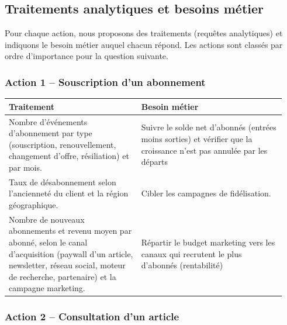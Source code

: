 \documentclass[a4paper,12pt]{article}
\begin{document}
\subsection{Traitements analytiques et besoins métier}

Pour chaque action, nous proposons des traitements (requêtes analytiques)
et indiquons le besoin métier auquel chacun répond. Les actions sont classés par ordre d'importance pour la question suivante.

\subsubsection*{Action 1 -- Souscription d'un abonnement}

\begin{center}
\renewcommand{\arraystretch}{1.3}
\begin{tabular}{@{}p{0.45\linewidth}p{0.49\linewidth}@{}}
  \toprule
  \textbf{Traitement} & \textbf{Besoin métier} \\
  \midrule
  Nombre d’événements d’abonnement par type (souscription, renouvellement, changement d’offre, résiliation) et par mois.
    & Suivre le solde net d’abonnés (entrées moins sorties) et vérifier que la croissance n’est pas annulée par les départs \\
  \addlinespace
  Taux de désabonnement selon l'ancienneté du client et la région
  géographique.
    & Cibler les campagnes de fidélisation. \\
  \addlinespace
  Nombre de nouveaux abonnements et revenu moyen par abonné, selon le canal d’acquisition (paywall d’un article, newsletter, réseau social, moteur de recherche, partenaire) et la campagne marketing.
    & Répartir le budget marketing vers les canaux qui recrutent le plus d'abonnés (rentabilité) \\
  \bottomrule
\end{tabular}
\end{center}

\subsubsection*{Action 2 -- Consultation d'un article}
\end{document}
